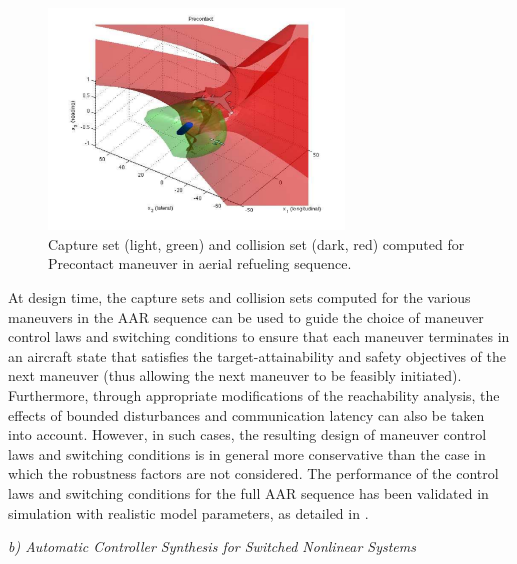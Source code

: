                \begin{figure}[thpb]
 	         \centering
	         \includegraphics[width=0.7\textwidth]{img/reachset-precontact}
	         \caption{Capture set (light, green) and collision set (dark, red) computed for Precontact maneuver in aerial refueling sequence.}
	         \label{fig:reachset_Precontact}
               \end{figure}

               At design time, the capture sets and collision sets
               computed for the various maneuvers in the AAR sequence
               can be used to guide the choice of maneuver control
               laws and switching conditions to ensure that each
               maneuver terminates in an aircraft state that satisfies
               the target-attainability and safety objectives of the
               next maneuver (thus allowing the next maneuver to be
               feasibly initiated). Furthermore, through appropriate
               modifications of the reachability analysis, the effects
               of bounded disturbances and communication latency can
               also be taken into account. However, in such cases, the
               resulting design of maneuver control laws and switching
               conditions is in general more conservative than the
               case in which the robustness factors are not
               considered.  The performance of the control laws and
               switching conditions for the full AAR sequence has been
               validated in simulation with realistic model
               parameters, as detailed in \cite{j:ding-aiaa-gnd-2011}.


               \emph{b) Automatic Controller Synthesis for Switched Nonlinear Systems}


